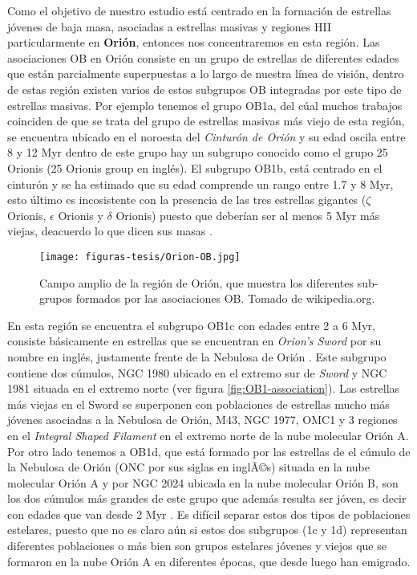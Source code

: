  Como el objetivo de nuestro estudio está centrado en la formación de estrellas jóvenes de baja masa, asociadas a estrellas masivas y regiones HII particularmente en \textbf{Orión}, entonces nos concentraremos en esta región. Las asociaciones OB en Orión consiste en un grupo de estrellas de diferentes edades que están parcialmente superpuestas a lo largo de nuestra línea de visión, dentro de estas región existen varios de estos subgrupos OB integradas por este tipo de estrellas masivas. Por ejemplo tenemos el grupo OB1a, del cúal muchos trabajos coinciden de que se trata del grupo de estrellas masivas más viejo de esta región, se encuentra ubicado en el noroesta del \textit{Cinturón de Orión} y su edad oscila entre 8 y 12 Myr \citep{Blaauw:1991, Brown:1994} dentro de este grupo hay un subgrupo conocido como el grupo 25 Orionis (25 Orionis group en inglés). El subgrupo OB1b, está centrado en el cinturón y se ha estimado que su edad comprende un rango entre 1.7 y 8 Myr, esto último es incosistente con la presencia de las tres estrellas gigantes (\(\zeta\) Orionis, \(\epsilon\) Orionis y \(\delta\) Orionis) puesto que deberían ser al menos 5 Myr más viejas, deacuerdo lo que dicen sus masas \citep{Bally:2008a}.\\

\begin{figure}
  \centering
  \texttt{[image: figuras-tesis/Orion-OB.jpg]}
  \caption{Campo amplio de la región de Orión, que muestra los diferentes sub-grupos formados por las asociaciones OB. Tomado de wikipedia.org.}
  \label{fig:orionOB}
\end{figure}
  
En esta región se encuentra el subgrupo OB1c con edades entre 2 a 6 Myr, consiste básicamente  en estrellas que se encuentran en \textit{Orion's Sword} por su nombre en inglés, justamente frente de la Nebulosa de Orión . Este subgrupo contiene dos cúmulos, NGC 1980 ubicado en el extremo sur de \textit{Sword} y NGC 1981 situada en el extremo norte (ver figura \ref{fig:OB1-association}). Las estrellas más viejas en el Sword se superponen con poblaciones de estrellas mucho más jóvenes asociadas a la Nebulosa de Orión, M43, NGC 1977, OMC1 y 3 regiones en el \textit{Integral Shaped Filament} en el extremo norte de la nube molecular Orión A. Por otro lado tenemos a OB1d, que está formado por las estrellas de el cúmulo de la Nebulosa de Orión (ONC por sus siglas en inglÃ©s) situada en la nube molecular Orión A y por NGC 2024 ubicada en la nube molecular Orión B, son los dos cúmulos más grandes de este grupo que además resulta ser jóven, es decir con edades que van desde 2 Myr \citep{Muench:2008a}. Es difícil separar estos dos tipos de poblaciones estelares, puesto que no es claro aún si estos dos subgrupos (1c y 1d) representan diferentes poblaciones o más bien son grupos estelares jóvenes y viejos que se formaron en la nube Orión A en diferentes épocas, que desde luego han emigrado.

